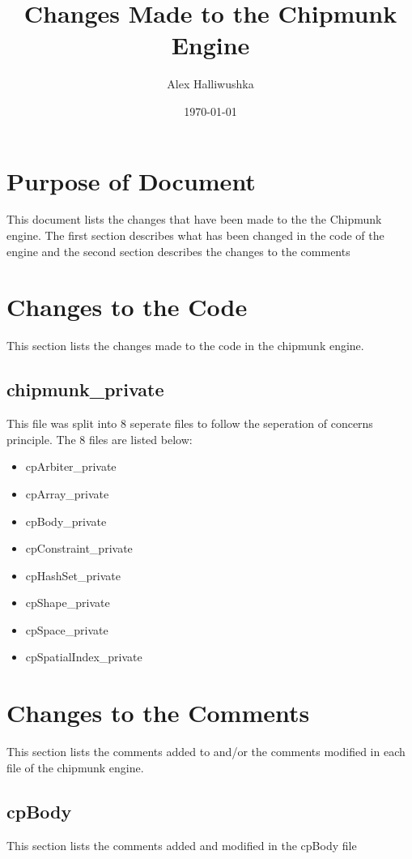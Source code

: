 \documentclass[12pt]{article}
\begin{document}
\title{Changes Made to the Chipmunk Engine} 
\author{Alex Halliwushka}
\date{\today}
	
\maketitle

\tableofcontents

\newpage

\section{Purpose of Document}
This document lists the changes that have been made to the
the Chipmunk engine. The first section describes what has been
changed in the code of the engine and the second section 
describes the changes to the comments

\section{Changes to the Code}
This section lists the changes made to the code in the chipmunk
engine.

\subsection{chipmunk\_private}
This file was split  into 8 seperate files to follow the seperation of concerns principle. 
The 8 files are listed below:

\begin{itemize}
\item cpArbiter\_private
\item cpArray\_private
\item cpBody\_private
\item cpConstraint\_private
\item cpHashSet\_private
\item cpShape\_private
\item cpSpace\_private
\item cpSpatialIndex\_private
\end{itemize}

\section{Changes to the Comments}
This section lists the comments added to and/or the comments modified 
in each file of the chipmunk engine. 

\subsection{cpBody} 
This section lists the comments added and modified  in the cpBody file
\end{document}
